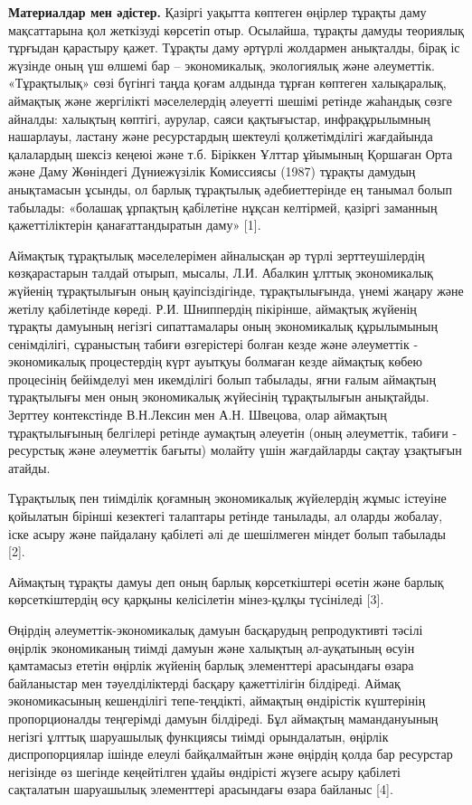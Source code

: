 \begin{multicols}{2}
{\bfseries Материалдар мен әдістер.} Қазіргі уақытта көптеген өңірлер
тұрақты даму мақсаттарына қол жеткізуді көрсетіп отыр. Осылайша, тұрақты
дамуды теориялық тұрғыдан қарастыру қажет. Тұрақты даму әртүрлі
жолдармен анықталды, бірақ іс жүзінде оның үш өлшемі бар --
экономикалық, экологиялық және әлеуметтік. «Тұрақтылық» сөзі бүгінгі
таңда қоғам алдында тұрған көптеген халықаралық, аймақтық және
жергілікті мәселелердің әлеуетті шешімі ретінде жаһандық сөзге айналды:
халықтың көптігі, аурулар, саяси қақтығыстар, инфрақұрылымның нашарлауы,
ластану және ресурстардың шектеулі қолжетімділігі жағдайында қалалардың
шексіз кеңеюі және т.б. Біріккен Ұлттар ұйымының Қоршаған Орта және Даму
Жөніндегі Дүниежүзілік Комиссиясы (1987) тұрақты дамудың анықтамасын
ұсынды, ол барлық тұрақтылық әдебиеттерінде ең танымал болып табылады:
«болашақ ұрпақтың қабілетіне нұқсан келтірмей, қазіргі заманның
қажеттіліктерін қанағаттандыратын даму» {[}1{]}.

Аймақтық тұрақтылық мәселелерімен айналысқан әр түрлі зерттеушілердің
көзқарастарын талдай отырып, мысалы, Л.И. Абалкин ұлттық экономикалық
жүйенің тұрақтылығын оның қауіпсіздігінде, тұрақтылығында, үнемі жаңару
және жетілу қабілетінде көреді. Р.И. Шниппердің пікірінше, аймақтық
жүйенің тұрақты дамуының негізгі сипаттамалары оның экономикалық
құрылымының сенімділігі, сұраныстың табиғи өзгерістері болған кезде және
әлеуметтік - экономикалық процестердің күрт ауытқуы болмаған кезде
аймақтық көбею процесінің бейімделуі мен икемділігі болып табылады, яғни
ғалым аймақтың тұрақтылығы мен оның экономикалық жүйесінің тұрақтылығын
анықтайды. Зерттеу контекстінде В.Н.Лексин мен А.Н. Швецова, олар
аймақтың тұрақтылығының белгілері ретінде аумақтың әлеуетін (оның
әлеуметтік, табиғи - ресурстық және әлеуметтік бағыты) молайту үшін
жағдайларды сақтау ұзақтығын атайды.

Тұрақтылық пен тиімділік қоғамның экономикалық жүйелердің жұмыс істеуіне
қойылатын бірінші кезектегі талаптары ретінде танылады, ал оларды
жобалау, іске асыру және пайдалану қабілеті әлі де шешілмеген міндет
болып табылады {[}2{]}.

Аймақтың тұрақты дамуы деп оның барлық көрсеткіштері өсетін және барлық
көрсеткіштердің өсу қарқыны келісілетін мінез-құлқы түсініледі {[}3{]}.

Өңірдің әлеуметтік-экономикалық дамуын басқарудың репродуктивті тәсілі
өңірлік экономиканың тиімді дамуын және халықтың әл-ауқатының өсуін
қамтамасыз ететін өңірлік жүйенің барлық элементтері арасындағы өзара
байланыстар мен тәуелділіктерді басқару қажеттілігін білдіреді. Аймақ
экономикасының кешенділігі тепе-теңдікті, аймақтың өндірістік күштерінің
пропорционалды теңгерімді дамуын білдіреді. Бұл аймақтың мамандануының
негізгі ұлттық шаруашылық функциясы тиімді орындалатын, өңірлік
диспропорциялар ішінде елеулі байқалмайтын және өңірдің қолда бар
ресурстар негізінде өз шегінде кеңейтілген ұдайы өндірісті жүзеге асыру
қабілеті сақталатын шаруашылық элементтері арасындағы өзара байланыс
{[}4{]}.


\end{multicols}
